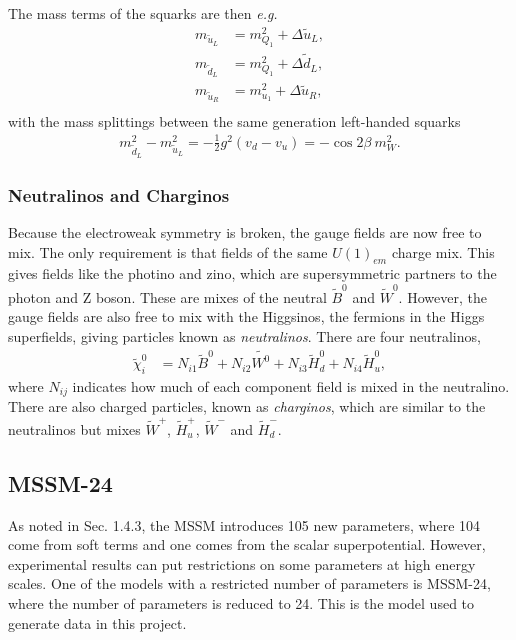 \documentclass[twoside,english]{uiofysmaster}
\begin{document}
{The mass terms of the squarks are then \textit{e.g.}
\begin{align}
m_{\widetilde{u}_L} &= m_{Q_1}^2 + \Delta \widetilde{u}_L,\\
m_{\widetilde{d}_L} &= m_{Q_1}^2 + \Delta \widetilde{d}_L,\\
m_{\widetilde{u}_R} &= m_{u_1}^2 + \Delta \widetilde{u}_R,\\
\end{align}
with the mass splittings between the same generation left-handed squarks
\begin{align}
m_{\widetilde{d}_L}^2 - m_{\widetilde{u}_L}^2 = - \frac{1}{2} g^2(v_d - v_u) = - \cos 2 \beta ~ m_W^2.
\end{align}


\subsubsection{Neutralinos and Charginos}

Because the electroweak symmetry is broken, the gauge fields are now free to mix. The only requirement is that fields of the same $U(1)_{em}$ charge mix. This gives  fields like the photino and zino, which are supersymmetric partners to the photon and Z boson. These are mixes of the neutral $\widetilde{B}^0$ and $\widetilde{W}^0$. However, the gauge fields are also free to mix with the Higgsinos, the fermions in the Higgs superfields, giving particles known as \textit{neutralinos}. There are four neutralinos,
\begin{align}
\widetilde{\chi}_i^0 &= N_{i1} \widetilde{B}^0 + N_{i2} \widetilde{W^0} + N_{i3} \widetilde{H}_d^0 + N_{i4} \widetilde{H}_u^0,
\end{align}
where $N_{ij}$ indicates how much of each component field is mixed in the neutralino. There are also charged particles, known as \textit{charginos}, which are similar to the neutralinos but mixes $\widetilde{W}^+$, $\widetilde{H}_u^+$, $\widetilde{W}^-$ and $\widetilde{H}_d^-$.

\subsection{MSSM-24}

As noted in Sec. 1.4.3, the MSSM introduces 105 new parameters, where 104 come from soft terms and one comes from the scalar superpotential. However, experimental results can put restrictions on some parameters at high energy scales. One of the models with a restricted number of parameters is MSSM-24, where the number of parameters is reduced to 24. This is the model used to generate data in this project. 

}
\end{document}
